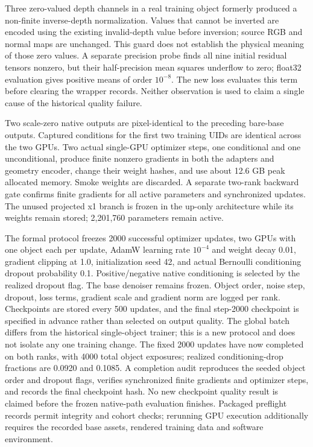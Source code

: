 \documentclass[11pt]{article}
\begin{document}
Three zero-valued depth channels in a real training object formerly produced a non-finite inverse-depth normalization. Values that cannot be inverted are encoded using the existing invalid-depth value before inversion; source RGB and normal maps are unchanged. This guard does not establish the physical meaning of those zero values. A separate precision probe finds all nine initial residual tensors nonzero, but their half-precision mean squares underflow to zero; float32 evaluation gives positive means of order $10^{-8}$. The new loss evaluates this term before clearing the wrapper records. Neither observation is used to claim a single cause of the historical quality failure.

Two scale-zero native outputs are pixel-identical to the preceding bare-base outputs. Captured conditions for the first two training UIDs are identical across the two GPUs. Two actual single-GPU optimizer steps, one conditional and one unconditional, produce finite nonzero gradients in both the adapters and geometry encoder, change their weight hashes, and use about 12.6 GB peak allocated memory. Smoke weights are discarded. A separate two-rank backward gate confirms finite gradients for all active parameters and synchronized updates. The unused projected x1 branch is frozen in the up-only architecture while its weights remain stored; 2,201,760 parameters remain active.

The formal protocol freezes 2000 successful optimizer updates, two GPUs with one object each per update, AdamW learning rate $10^{-4}$ and weight decay 0.01, gradient clipping at 1.0, initialization seed 42, and actual Bernoulli conditioning dropout probability 0.1. Positive/negative native conditioning is selected by the realized dropout flag. The base denoiser remains frozen. Object order, noise step, dropout, loss terms, gradient scale and gradient norm are logged per rank. Checkpoints are stored every 500 updates, and the final step-2000 checkpoint is specified in advance rather than selected on output quality. The global batch differs from the historical single-object trainer; this is a new protocol and does not isolate any one training change. The fixed 2000 updates have now completed on both ranks, with 4000 total object exposures; realized conditioning-drop fractions are 0.0920 and 0.1085. A completion audit reproduces the seeded object order and dropout flags, verifies synchronized finite gradients and optimizer steps, and records the final checkpoint hash. No new checkpoint quality result is claimed before the frozen native-path evaluation finishes. Packaged preflight records permit integrity and cohort checks; rerunning GPU execution additionally requires the recorded base assets, rendered training data and software environment.
\end{document}
